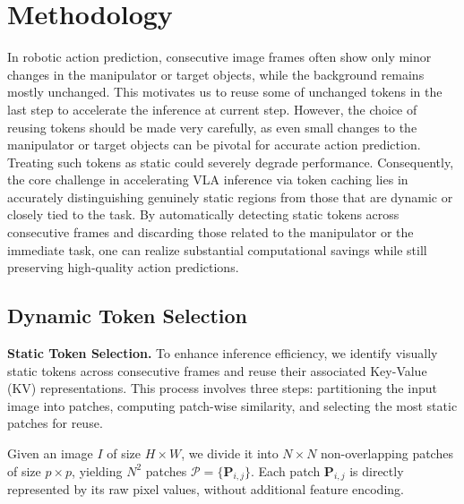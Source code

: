 \section{Methodology}

In robotic action prediction, consecutive image frames often show only minor changes in the manipulator or target objects, while the background remains mostly unchanged. This motivates us to reuse some of unchanged tokens in the last step to accelerate the inference at current step. However, the choice of reusing tokens should be made very carefully, as even small changes to the manipulator or target objects can be pivotal for accurate action prediction. Treating such tokens as static could severely degrade performance. Consequently, the core challenge in accelerating VLA inference via token caching lies in accurately distinguishing genuinely static regions from those that are dynamic or closely tied to the task. By automatically detecting static tokens across consecutive frames and discarding those related to the manipulator or the immediate task, one can realize substantial computational savings while still preserving high-quality action predictions. 


\subsection{Dynamic Token Selection}

\label{sec:dynamic_selection}
\textbf{Static Token Selection.}
To enhance inference efficiency, we identify visually static tokens across consecutive frames and reuse their associated Key-Value (KV) representations. This process involves three steps: partitioning the input image into patches, computing patch-wise similarity, and selecting the most static patches for reuse.

Given an image \(I\) of size \(H \times W\), we divide it into \(N \times N\) non-overlapping patches of size \(p \times p\), yielding \(N^2\) patches \(\mathcal{P} = \{\mathbf{P}_{i,j}\}\). Each patch \(\mathbf{P}_{i,j}\) is directly represented by its raw pixel values, without additional feature encoding.

